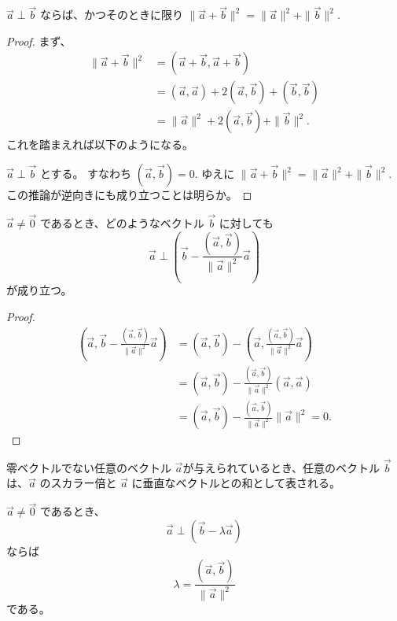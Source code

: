 \begin{thm}\label{theorem:13}
  \(\vec{a}\perp\vec{b}\) ならば、かつそのときに限り \(\|\vec{a}+\vec{b}\|^2=\|\vec{a}\|^2+\|\vec{b}\|^2.\)
\end{thm}

\begin{proof}
  まず、
  \begin{align*}
    \|\vec{a}+\vec{b}\|^2 &= (\vec{a}+\vec{b},\vec{a}+\vec{b}) \\
                          &= (\vec{a},\vec{a})+2(\vec{a},\vec{b})+(\vec{b},\vec{b}) \\
                          &= \|\vec{a}\|^2+2(\vec{a},\vec{b})+\|\vec{b}\|^2.
  \end{align*}
  これを踏まえれば以下のようになる。

  \(\vec{a}\perp\vec{b}\) とする。
  すなわち \((\vec{a},\vec{b})=0.\)
  ゆえに \(\|\vec{a}+\vec{b}\|^2=\|\vec{a}\|^2+\|\vec{b}\|^2.
  \) この推論が逆向きにも成り立つことは明らか。
\end{proof}

\begin{thm}\label{theorem:14}
  \(\vec{a}\neq\vec{0}\) であるとき、どのようなベクトル \(\vec{b}\) に対しても
  \[\vec{a}\perp\left(\vec{b}-\frac{(\vec{a},\vec{b})}{\|\vec{a}\|^2}\vec{a}\right)\]
  が成り立つ。
\end{thm}

\begin{proof}
  \begin{align*}
    \left(\vec{a},\vec{b}-\frac{(\vec{a},\vec{b})}{\|\vec{a}\|^2}\vec{a}\right) &= (\vec{a},\vec{b})-\left(\vec{a},\frac{(\vec{a},\vec{b})}{\|\vec{a}\|^2}\vec{a}\right) \\
                              &= (\vec{a},\vec{b})-\frac{(\vec{a},\vec{b})}{\|\vec{a}\|^2}(\vec{a},\vec{a}) \\
                              &= (\vec{a},\vec{b})-\frac{(\vec{a},\vec{b})}{\|\vec{a}\|^2}\|\vec{a}\|^2=0.
  \end{align*}
\end{proof}

\begin{col*}
  零ベクトルでない任意のベクトル \(\vec{a}\)が与えられているとき、任意のベクトル \(\vec{b}\) は、\(\vec{a}\) のスカラー倍と \(\vec{a}\) に垂直なベクトルとの和として表される。
\end{col*}

\begin{thm}\label{theorem:15}
  \(\vec{a}\neq\vec{0}\) であるとき、
  \[\vec{a}\perp(\vec{b}-\lambda\vec{a})\]
  ならば
  \[\lambda=\frac{(\vec{a},\vec{b})}{\|\vec{a}\|^2}\]
  である。
\end{thm}

